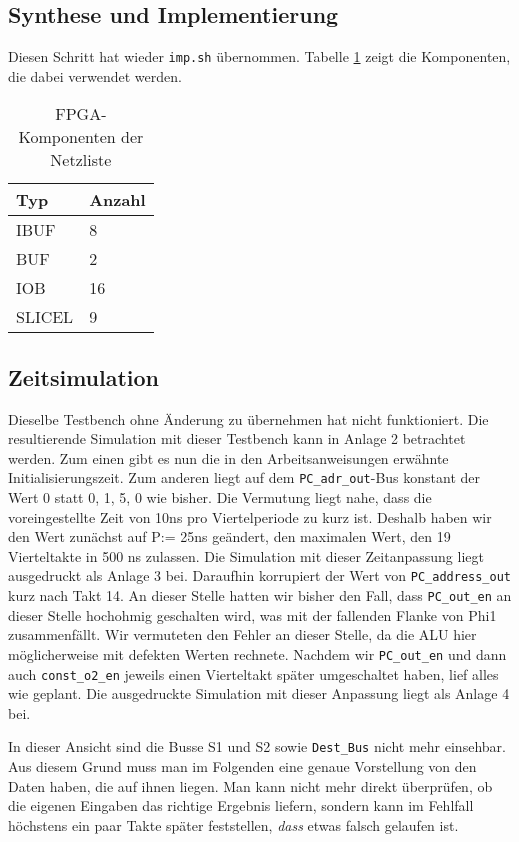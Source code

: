\documentclass[12pt,a4paper]{scrartcl}
\begin{document}
\subsection{Synthese und Implementierung}
Diesen Schritt hat wieder \texttt{imp.sh} \"ubernommen.
Tabelle \ref{netzliste} zeigt die Komponenten, die dabei verwendet werden.

\begin{table}[h]
    \centering
    \begin{tabular}{l|l}
    \hline
    Typ     & Anzahl  \\
    \hline
    IBUF    & 8       \\ %
    BUF     & 2       \\ %
    IOB     & 16      \\ %
    SLICEL  & 9       \\
    \hline
    \end{tabular}
    \caption{FPGA-Komponenten der Netzliste}
    \label{netzliste}
\end{table}

\subsection{Zeitsimulation}
Dieselbe Testbench ohne \"Anderung zu \"ubernehmen hat nicht funktioniert. Die resultierende Simulation mit dieser Testbench kann in Anlage 2 betrachtet werden.
Zum einen gibt es nun die in den Arbeitsanweisungen erw\"ahnte Initialisierungszeit.
Zum anderen liegt auf dem \texttt{PC\_adr\_out}-Bus konstant der Wert 0 statt 0, 1, 5, 0 wie bisher.
Die Vermutung liegt nahe, dass die voreingestellte Zeit von 10ns pro Viertelperiode zu kurz ist.
Deshalb haben wir den Wert zun\"achst auf P:= 25ns ge\"andert, den maximalen Wert, den 19 Vierteltakte in 500 ns zulassen. Die Simulation mit dieser Zeitanpassung liegt ausgedruckt als Anlage 3 bei.
Daraufhin korrupiert der Wert von \texttt{PC\_address\_out} kurz nach Takt 14.
An dieser Stelle hatten wir bisher den Fall, dass \texttt{PC\_out\_en} an dieser Stelle hochohmig geschalten wird, was mit der fallenden Flanke von Phi1 zusammenf\"allt.
Wir vermuteten den Fehler an dieser Stelle, da die ALU hier m\"oglicherweise mit defekten Werten rechnete.
Nachdem wir \texttt{PC\_out\_en} und dann auch \texttt{const\_o2\_en} jeweils einen Vierteltakt sp\"ater umgeschaltet haben, lief alles wie geplant.
Die ausgedruckte Simulation mit dieser Anpassung liegt als Anlage 4 bei.

In dieser Ansicht sind die Busse S1 und S2 sowie \texttt{Dest\_Bus} nicht mehr einsehbar.
Aus diesem Grund muss man im Folgenden eine genaue Vorstellung von den Daten haben, die auf ihnen liegen.
Man kann nicht mehr direkt \"uberpr\"ufen, ob die eigenen Eingaben das richtige Ergebnis liefern, sondern kann im Fehlfall h\"ochstens ein paar Takte sp\"ater feststellen, \emph{dass} etwas falsch gelaufen ist.
\end{document}
